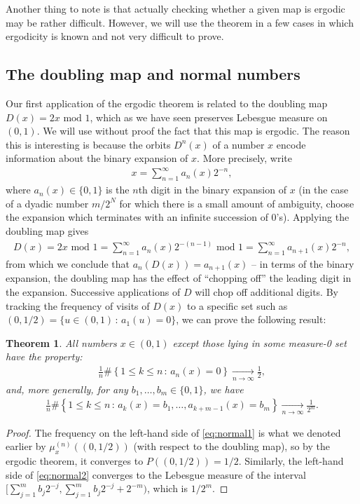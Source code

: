 \documentclass[12pt]{amsart}
\newcommand{\eq}[1]{\begin{equation}\begin{split}#1\end{split}\end{equation}}
\newcommand{\eqst}[1]{\begin{align*}#1\end{align*}}
\newtheorem{thm}{Theorem}
\begin{document}
Another thing to note is that actually checking whether a given map is ergodic may be rather difficult. However, we will use the theorem in a few cases in which ergodicity is known and not very difficult to prove.

\subsection{The doubling map and normal numbers}
\label{sec:normalnumbers}

Our first application of the ergodic theorem is related to the doubling map $D(x)=2x\textrm{ mod }1$, which as we have seen preserves Lebesgue measure on $(0,1)$. We will use without proof the fact that this map is ergodic. The reason this is interesting is because the orbits $D^n(x)$ of a number $x$ encode information about the binary expansion of $x$. More precisely, write
\eqst{ x = \sum_{n=1}^\infty a_n(x) 2^{-n},
}
where $a_n(x) \in \{0,1\}$ is the $n$th digit in the binary expansion of $x$ (in the case of a dyadic number $m/2^N$ for which there is a small amount of ambiguity, choose the expansion which terminates with an infinite succession of $0$'s). Applying the doubling map gives
\eqst{
D(x) = 2x\textrm{ mod 1} = \sum_{n=1}^\infty a_n(x) 2^{-(n-1)} \textrm{ mod }1 = \sum_{n=1}^\infty a_{n+1}(x)2^{-n},
}
from which we conclude that $a_n(D(x)) = a_{n+1}(x)$ -- in terms of the binary expansion, the doubling map has the effect of ``chopping off'' the leading digit in the expansion. Successive applications of $D$ will chop off additional digits. By tracking the frequency of visits of $D(x)$ to a specific set such as $(0,1/2) = \{ u\in(0,1)\,:\, a_1(u)=0 \}$, we can prove the following result:

\begin{thm} All numbers $x\in(0,1)$ except those lying in some measure-0 set have the property:
\eq{ \label{eq:normal1}
\frac{1}{n}\#\left\{ 1\le k\le n\,:\, a_n(x) = 0 \right\} \xrightarrow[n\to\infty]{} \tfrac12,
}
and, more generally, for any $b_1,\ldots,b_m\in\{0,1\}$, we have
\eq{ \label{eq:normal2}
\frac{1}{n}\#\left\{ 1\le k\le n\,:\, a_k(x) = b_1,\ldots, a_{k+m-1}(x)=b_m \right\} \xrightarrow[n\to\infty]{} \frac{1}{2^m}.
}
\end{thm}

\begin{proof}
The frequency on the left-hand side of \eqref{eq:normal1} is what we denoted earlier by $\mu_x^{(n)}((0,1/2))$ (with respect to the doubling map), so by the ergodic theorem, it converges to $P((0,1/2))=1/2$. Similarly, the left-hand side of \eqref{eq:normal2} converges to the Lebesgue measure of the interval $[\sum_{j=1}^m b_j 2^{-j},\sum_{j=1}^m b_j 2^{-j}+2^{-m})$, which is $1/2^m$.
\end{proof}
\end{document}
